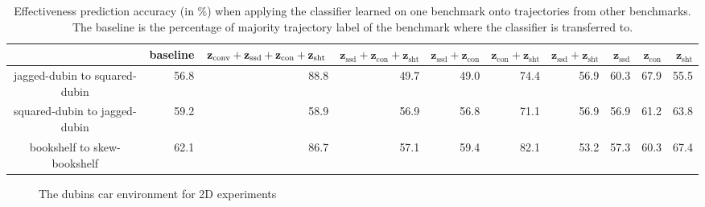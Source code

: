 \documentclass[letterpaper, 10 pt, conference]{ieeeconf}  %
\newcommand{\fssd}{\mbox{$\mathbf z_{\text{ssd}}$}}
\newcommand{\fcon}{\mbox{$\mathbf z_{\text{con}}$}}
\newcommand{\fsht}{\mbox{$\mathbf z_{\text{sht}}$}}
\begin{document}
\begin{table}[tbp]
\centering
\begin{tabular}{|c|r|r|r|r|r|r|r|r|r|}
\hline 
 & baseline &  ${\bf z}_\textrm{conv} +\fssd+\fcon+\fsht$ & $\fssd+\fcon+\fsht$ & $\fssd+\fcon$ & $\fcon+\fsht$ & $\fssd+\fsht$ & $\fssd$ & $\fcon$ & $\fsht$ \\ \hline \hline
jagged-dubin to squared-dubin &  56.8 & 88.8 & 49.7 & 49.0 &	74.4 & 	56.9 & 	60.3	 & 67.9	& 55.5
 \\ \hline
squared-dubin to jagged-dubin & 59.2 & 58.9 & 56.9 &	56.8 &	71.1 & 	56.9 &	56.9 &	61.2 &	63.8 \\ \hline
bookshelf to skew-bookshelf & 62.1 & 86.7 & 57.1 &	59.4 &	82.1 & 	53.2 &	57.3 &	60.3 &	67.4 \\ \hline
\end{tabular}
\caption{Effectiveness prediction accuracy (in \%) when applying the classifier learned on one benchmark onto trajectories from other benchmarks. The baseline is the percentage of majority trajectory label of the benchmark where the classifier is transferred to.}
\label{tab:result2}
\end{table}



\begin{figure}[t]
\centering
{} \qquad
{} \qquad
{}
\caption{The dubins car environment for 2D experiments}
\label{fig:benchmarks1}
\end{figure}
\end{document}
